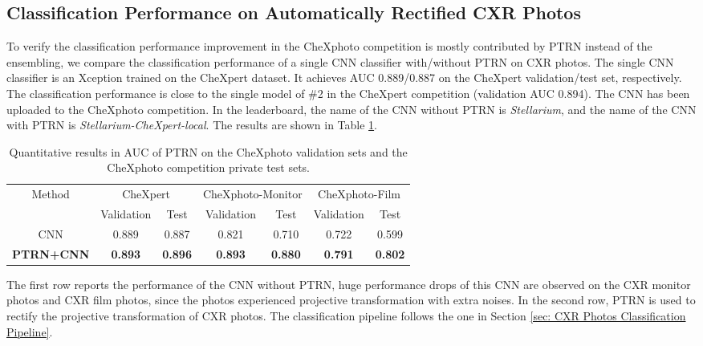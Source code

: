 \documentclass[preprint, 12pt]{elsarticle}
\begin{document}
\subsection{Classification Performance on Automatically Rectified CXR Photos} \label{sec: Classification Performance on Automatically Rectified CXR Photos}

To verify the classification performance improvement in the CheXphoto competition is mostly contributed by PTRN instead of the ensembling, we compare the classification performance of a single CNN classifier with/without PTRN on CXR photos. The single CNN classifier is an Xception \cite{chollet2017xception} trained on the CheXpert dataset. It achieves AUC 0.889/0.887 on the CheXpert validation/test set, respectively. The classification performance is close to the single model of \#2 \cite{pham2021interpreting} in the CheXpert competition (validation AUC 0.894). The CNN has been uploaded to the CheXphoto competition. In the leaderboard, the name of the CNN without PTRN is \textit{Stellarium}, and the name of the CNN with PTRN is \textit{Stellarium-CheXpert-local}. The results are shown in Table \ref{tab:ptrn}.

\begin{table}
    \centering
    \footnotesize
    \begin{tabular}{c||cc|cc|cc}
        \hline
        \multirow{2}{4em}{Method} & \multicolumn{2}{c|}{CheXpert} & \multicolumn{2}{c|}{CheXphoto-Monitor} & \multicolumn{2}{c}{CheXphoto-Film} \\
        \cline{2-7}
        & Validation & Test & Validation & Test & Validation & Test\\
        \hline
        CNN & 0.889 & 0.887 & 0.821 & 0.710 & 0.722 & 0.599 \\
        \textbf{PTRN+CNN} & \textbf{0.893} & \textbf{0.896} & \textbf{0.893} & \textbf{0.880} & \textbf{0.791} & \textbf{0.802} \\
        \hline
    \end{tabular}
    \caption{Quantitative results in AUC of PTRN on the CheXphoto validation sets and the CheXphoto competition private test sets.}
    \label{tab:ptrn}
\end{table}

The first row reports the performance of the CNN without PTRN, huge performance drops of this CNN are observed on the CXR monitor photos and CXR film photos, since the photos experienced projective transformation with extra noises. In the second row, PTRN is used to rectify the projective transformation of CXR photos. The classification pipeline follows the one in Section \ref{sec: CXR Photos Classification Pipeline}.
\end{document}
